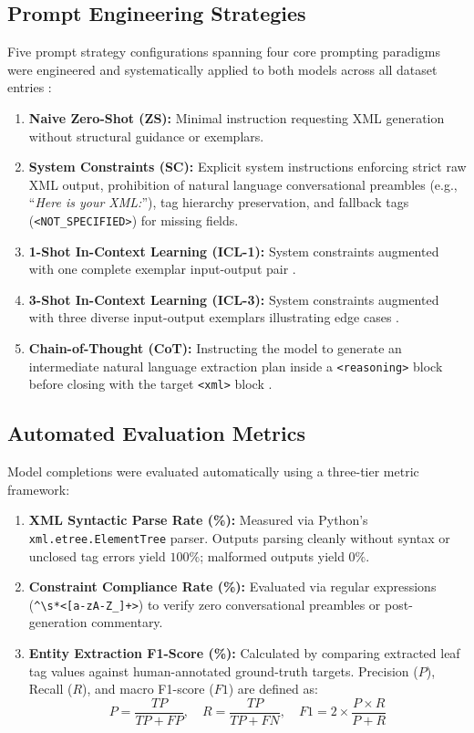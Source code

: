 \documentclass[11pt,a4paper]{article}
\begin{document}
\subsection{Prompt Engineering Strategies}
Five prompt strategy configurations spanning four core prompting paradigms were engineered and systematically applied to both models across all dataset entries \cite{brown2020language, wei2022chain}:
\begin{enumerate}
    \item \textbf{Naive Zero-Shot (ZS):} Minimal instruction requesting XML generation without structural guidance or exemplars.
    \item \textbf{System Constraints (SC):} Explicit system instructions enforcing strict raw XML output, prohibition of natural language conversational preambles (e.g., ``\textit{Here is your XML:}''), tag hierarchy preservation, and fallback tags (\texttt{<NOT\_SPECIFIED>}) for missing fields.
    \item \textbf{1-Shot In-Context Learning (ICL-1):} System constraints augmented with one complete exemplar input-output pair \cite{brown2020language}.
    \item \textbf{3-Shot In-Context Learning (ICL-3):} System constraints augmented with three diverse input-output exemplars illustrating edge cases \cite{brown2020language}.
    \item \textbf{Chain-of-Thought (CoT):} Instructing the model to generate an intermediate natural language extraction plan inside a \texttt{<reasoning>} block before closing with the target \texttt{<xml>} block \cite{wei2022chain}.
\end{enumerate}

\subsection{Automated Evaluation Metrics}
Model completions were evaluated automatically using a three-tier metric framework:
\begin{enumerate}
    \item \textbf{XML Syntactic Parse Rate (\%):} Measured via Python's \texttt{xml.etree.ElementTree} parser. Outputs parsing cleanly without syntax or unclosed tag errors yield $100\%$; malformed outputs yield $0\%$.
    \item \textbf{Constraint Compliance Rate (\%):} Evaluated via regular expressions (\texttt{\^{}\textbackslash s*<[a-zA-Z\_]+>}) to verify zero conversational preambles or post-generation commentary.
    \item \textbf{Entity Extraction F1-Score (\%):} Calculated by comparing extracted leaf tag values against human-annotated ground-truth targets. Precision ($P$), Recall ($R$), and macro F1-score ($F1$) are defined as:
    \begin{equation}
        P = \frac{TP}{TP + FP}, \quad R = \frac{TP}{TP + FN}, \quad F1 = 2 \times \frac{P \times R}{P + R}
    \end{equation}
\end{enumerate}
\end{document}
